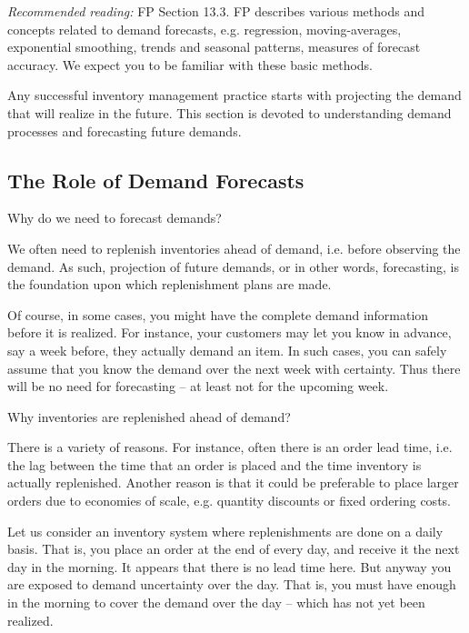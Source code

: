 \textit{Recommended reading:} FP Section 13.3. FP describes various methods and concepts related to demand forecasts, e.g. regression, moving-averages, exponential smoothing, trends and seasonal patterns, measures of forecast accuracy. We expect you to be familiar with these basic methods. 

Any successful inventory management practice starts with projecting the demand that will realize in the future. This section is devoted to understanding demand processes and forecasting future demands. 

\subsection{The Role of Demand Forecasts}

\begin{question}
Why do we need to forecast demands?

\end{question}

  \begin{solution}
    We often need to replenish inventories ahead of demand, i.e. before observing the demand. As such, projection of future demands, or in other words, forecasting, is the foundation upon which replenishment plans are made. 
    
    Of course, in some cases, you might have the complete demand information before it is realized. For instance, your customers may let you know in advance, say a week before, they actually demand an item. In such cases, you can safely assume that you know the demand over the next week with certainty. Thus there will be no need for forecasting -- at least not for the upcoming week. 
  \end{solution}

\begin{question}
Why inventories are replenished ahead of demand?
\end{question}

  \begin{solution}
    There is a variety of reasons. For instance, often there is an order lead time, i.e. the lag between the time that an order is placed and the time inventory is actually replenished. Another reason is that it could be preferable to place larger orders due to economies of scale, e.g. quantity discounts or fixed ordering costs. 
    
	Let us consider an inventory system where replenishments are done on a daily basis. That is, you place an order at the end of every day, and receive it the next day in the morning. It appears that there is no lead time here. But anyway you are exposed to demand uncertainty over the day. That is, you must have enough in the morning to cover the demand over the day -- which has not yet been realized. 
  \end{solution}


